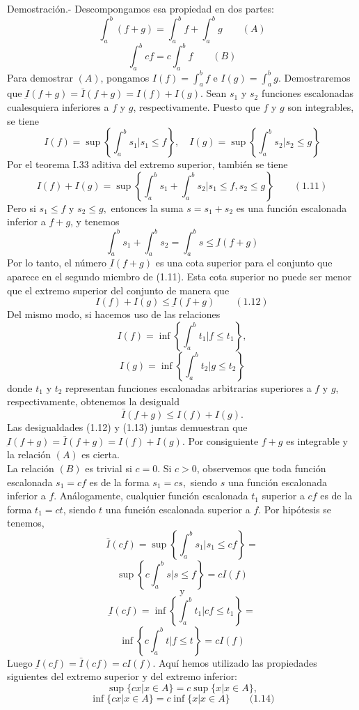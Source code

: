 \begin{multicols}{2}
\begin{teo}
    Demostración.-\; Descompongamos esa propiedad en dos partes:
    $$\int_a^b (f+g) = \int_a^b f + \int_a^b g \qquad (A)$$
    $$\int_a^b cf = c \int_a^b f \qquad (B)$$
    Para demostrar $(A)$, pongamos $I(f) = \int_a^b f$ e $I(g) = \int_a^b g$. Demostraremos que $\underbar{I}(f+g) = \bar{I}(f+g) = I(f) + I(g).$
    Sean $s_1$ y $s_2$ funciones escalonadas cualesquiera inferiores a $f$ y $g$, respectivamente. Puesto que $f$ y $g$ son integrables, se tiene $$I(f) = \sup\left\{ \int_a^b s_1 | s_1 \leq f \right\}, \quad I(g) =\sup\left\{ \int_a^b s_2 | s_2 \leq g\right\}$$
    Por el teorema I.33 aditiva del extremo superior, también se tiene $$I(f) + I(g) = \sup\left\{\int_a^b s_1 + \int_a^b s_2 | s_1 \leq f, s_2\leq g\right\} \qquad (1.11)$$
    Pero si $s_1\leq f$ y $s_2 \leq g,$ entonces la suma $s=s_1+s_2$ es una función escalonada inferior a $f+g$, y tenemos 
    $$\int_a^b s_1 + \int_a^b s_2 = \int_a^b s \leq \underbar{I}(f+g)$$
    Por lo tanto, el número $\underbar{I}(f+g)$ es una cota superior para el conjunto que aparece en el segundo miembro de (1.11). Esta cota superior no puede ser menor que el extremo superior del conjunto de manera que $$I(f) + I(g) \leq \underbar{I}(f+g) \qquad (1.12)$$ 
    Del mismo modo, si hacemos uso de las relaciones 
    $$I(f) = \inf\left\{\int_a^b t_1 | f\leq t_1\right\},$$ $$I(g)= \inf\left\{\int_a^b t_2 | g\leq t_2\right\}$$
    donde $t_1$ y $t_2$ representan funciones escalonadas arbitrarias superiores a $f$ y $g$, respectivamente, obtenemos la desiguald
    $$\bar{I}(f+g) \leq I(f) + I(g).$$
    Las desigualdades (1.12) y (1.13) juntas demuestran que $\underbar{I}(f+g) = \bar{I} (f+g) = I(f) + I(g)$. Por consiguiente $f+g$ es integrable y la relación $(A)$ es cierta.\\
    La relación $(B)$ es trivial si $c=0$. Si $c>0$, observemos que toda función escalonada $s_1=cf$ es de la forma $s_1=cs,$ siendo $s$ una función escalonada inferior a $f$. Análogamente, cualquier función escalonada $t_1$ superior a $cf$ es de la forma $t_1=ct$, siendo $t$ una función escalonada superior a $f$. Por hipótesis se tenemos, 
    $$\bar{I}(cf) = \sup\left\{ \int_a^b s_1 | s_1 \leq cf\right\} =$$$$ \sup\left\{c\int_a^b s | s \leq f\right\} = cI(f)$$
    $$\mbox{y}$$ 
    $$\underbar{I}(cf) = \inf\left\{\int_a^b t_1 | cf \leq t_1\right\} =$$$$ \inf\left\{c\int_a^b t | f \leq t\right\} = cI(f)$$
    Luego $\underbar{I}(cf)=\bar{I}(cf)=cI(f).$ Aquí hemos utilizado las propiedades siguientes del extremo superior y del extremo inferior:
    $$\sup \lbrace cx | x\in A \rbrace = c \sup \lbrace x|x\in A \rbrace,$$$$ \inf \lbrace c x | x \in A\rbrace = c \inf\lbrace x|x\in A \rbrace \qquad \mbox{(1.14)}$$

\end{teo}
\end{multicols}
